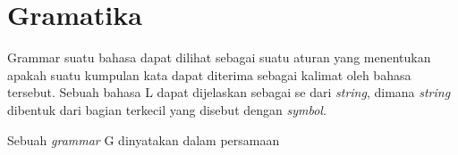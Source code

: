 \section{Gramatika}
Grammar suatu bahasa dapat dilihat sebagai suatu aturan yang menentukan apakah suatu kumpulan kata dapat diterima sebagai kalimat oleh bahasa tersebut. Sebuah bahasa L dapat dijelaskan sebagai se dari \emph{string}, dimana \emph{string} dibentuk dari bagian terkecil yang disebut dengan \emph{symbol}.

Sebuah \emph{grammar} G dinyatakan dalam persamaan 